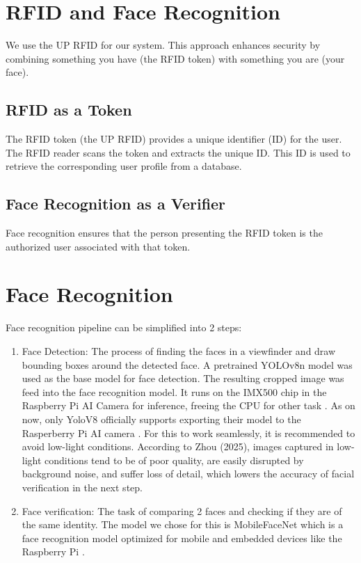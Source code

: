 \section{RFID and Face Recognition}
We use the UP RFID for our system. This approach enhances security by combining something you have (the RFID token) with something you are (your face).
\subsection{RFID as a Token}
The RFID token (the UP RFID) provides a unique identifier (ID) for the user. The RFID reader scans the token and extracts the unique ID. This ID is used to retrieve the corresponding user profile from a database.
\subsection{Face Recognition as a Verifier}
Face recognition ensures that the person presenting the RFID token is the authorized user associated with that token.

\section{Face Recognition}
Face recognition pipeline can be simplified into 2 steps:
\begin{enumerate}
	\item Face Detection: The process of finding the faces in a viewfinder and draw bounding boxes around the detected face. A pretrained YOLOv8n model was used as the base model for face detection. The resulting cropped image was feed into the face recognition model. It runs on the IMX500 chip in the Raspberry Pi AI Camera for inference, freeing the CPU for other task \cite{sony_imx500}. As on now, only YoloV8 officially supports exporting their model to the Rasperberry Pi AI camera \cite{ultralytics_imx500}. For this to work seamlessly, it is recommended to avoid low-light conditions. According to Zhou (2025), images captured in low-light conditions tend to be of poor quality, are easily disrupted by background noise, and suffer loss of detail, which lowers the accuracy of facial verification in the next step.
	
	\item Face verification: The task of comparing 2 faces and checking if they are of the same identity. The model we chose for this is MobileFaceNet which is a face recognition model optimized for mobile and embedded devices like the Raspberry Pi \cite{chen2018mobilefacenets}.
\end{enumerate}

